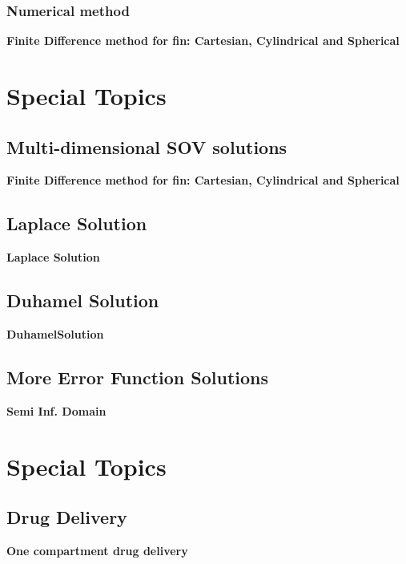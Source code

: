 \begin{appendices}
\subsection{Numerical method}
\begin{example}
\textbf{Finite Difference method for fin: Cartesian, Cylindrical and Spherical}
\end{example}

\chapter{Special Topics \uppercase\expandafter{}}
\section{Multi-dimensional SOV solutions}

\begin{example}
\textbf{Finite Difference method for fin: Cartesian, Cylindrical and Spherical}
\end{example}

\section{Laplace Solution}
\begin{example}
\textbf{Laplace Solution}
\end{example}

\section{Duhamel Solution}
\begin{example}
\textbf{DuhamelSolution}
\end{example}

\section{More Error Function Solutions}
\begin{example}
\textbf{Semi Inf. Domain}
\end{example}

\chapter{Special Topics \uppercase\expandafter{}}

\section{Drug Delivery}
\begin{example}
\textbf{One compartment drug delivery}
\end{example}


\end{appendices}
